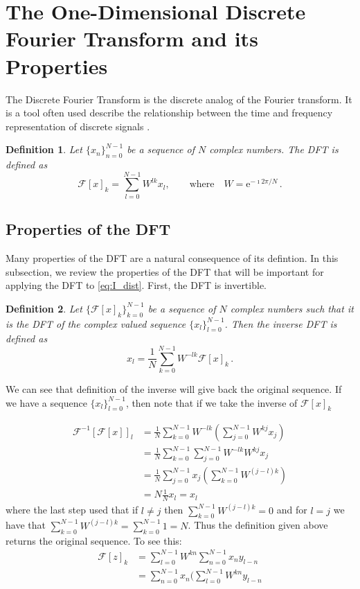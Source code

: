 \documentclass[12pt]{CSUNthesis}
\newtheorem{definition}{Definition}
\def\e{\mathrm{e}}
\def\calF{\mathcal{F}}
\begin{document}
\section{The One-Dimensional Discrete Fourier Transform and its Properties}

The Discrete Fourier Transform is the discrete analog of the Fourier transform. It is a tool often used describe the relationship between the time and frequency representation of discrete signals \cite{Nussbaumer1982}. 
\begin{definition}
Let $\{x_n\}_{n=0}^{N-1}$ be a sequence of $N$ complex numbers. The DFT is defined as
\begin{equation}
\label{eq:dft_1d}
\calF[x]_{k} =  \sum_{l=0}^{N-1} W^{lk} x_l, \qquad  
\mbox{where}\quad 
W=\e^{-\imath 2\pi/N}\, .
\end{equation}
\end{definition}

\subsection{Properties of the DFT}

Many properties of the DFT are a natural consequence of its defintion. In this subsection, we review the properties of the DFT that will be important for applying the DFT to \ref{eq:I_dist}. First, the DFT is invertible.

\begin{definition}
Let $\{\calF [x]_k\}_{k=0}^{N-1}$ be a sequence of $N$ complex numbers such that it is the DFT of the complex valued sequence $\{x_l\}_{l=0}^{N-1}$. Then the inverse DFT is defined as
\begin{equation}
\label{eq:idft_1d}
x_{l} = \frac{1}{N} \sum_{k=0}^{N-1} W^{-lk} \calF[x]_{k} \, .
\end{equation}
\end{definition}

We can see that definition of the inverse will give back the original sequence. If we have a sequence $\{x_l\}_{l=0}^{N-1}$, then note that if we take the inverse of $\calF[x]_k$

\begin{align*}
\calF^{-1}[\calF[x]]_l &= \frac{1}{N} \sum_{k=0}^{N-1}W^{-lk}(\sum_{j=0}^{N-1} W^{kj} x_j) \\
 &= \frac{1}{N} \sum_{k=0}^{N-1} \sum_{j=0}^{N-1} W^{-lk} W^{kj} x_j \\
 &= \frac{1}{N} \sum_{j=0}^{N-1}  x_j (\sum_{k=0}^{N-1} W^{(j-l)k}) \\
 &= N \frac{1}{N} x_l = x_l
\end{align*}
where the last step used that if $l \not = j$ then $\sum_{k=0}^{N-1} W^{(j-l)k} = 0$ and for $l=j$ we have that $\sum_{k=0}^{N-1} W^{(j-l)k} = \sum_{k=0}^{N-1} 1 = N$. Thus the definition given above returns the original sequence. To see this:
\begin{align*}
\calF[z]_k &= \sum_{l=0}^{N-1} W^{kn} \sum_{n=0}^{N-1} x_{n}y_{l-n} \\
&= \sum_{n=0}^{N-1} x_{n} ( \sum_{l=0}^{N-1} W^{kn}y_{l-n}
\end{align*}
\end{document}
